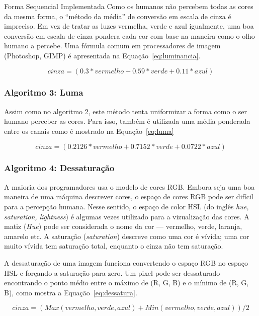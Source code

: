 \begin{subsection}{Forma Sequencial Implementada}
Como os humanos não percebem todas as cores da mesma forma, o ``método da média'' de
conversão em escala de cinza é impreciso. Em vez de tratar as luzes vermelha,
verde e azul igualmente, uma boa conversão em escala de cinza pondera cada cor
com base na maneira como o olho humano a percebe. Uma fórmula comum em
processadores de imagem (Photoshop, GIMP) é apresentada na
Equação~\ref{eq:luminancia}.


\begin{equation}
\label{eq:luminancia}
cinza = (0.3*vermelho + 0.59*verde + 0.11*azul)
\end{equation}

\subsubsection{Algoritmo 3: Luma}

Assim como no algoritmo 2, este método tenta uniformizar a forma como o ser
humano perceber as cores. Para isso, também é utilizada uma média ponderada
entre os canais como é mostrado na Equação~\ref{eq:luma}

\begin{equation}
\label{eq:luma}
cinza = (0.2126*vermelho + 0.7152*verde + 0.0722*azul)
\end{equation}


\subsubsection{Algoritmo 4: Dessaturação}

A maioria dos programadores usa o modelo de cores RGB. Embora seja uma boa
maneira de uma máquina descrever cores, o espaço de cores RGB pode ser difícil
para a percepção humana. Nesse sentido, o espaço de color HSL (do inglês
\textit{hue, saturation, lightness}) é algumas vezes utilizado para a
vizualização das cores. A matiz (\textit{Hue}) pode ser considerada o nome da
cor --- vermelho, verde, laranja, amarelo etc.  A saturação
(\textit{saturation}) descreve como uma cor é vívida; uma cor muito vívida tem
saturação total, enquanto o cinza não tem saturação. 

A dessaturação de uma imagem funciona convertendo o espaço RGB no espaço HSL e 
forçando a saturação para zero. Um pixel pode ser dessaturado encontrando o
ponto médio entre o máximo de (R, G, B) e o mínimo de (R, G, B), como mostra a
Equação~\ref{eq:dessatura}.

\begin{equation}
\label{eq:dessatura}
cinza = ( Max(vermelho, verde, azul) + Min(vermelho, verde, azul) ) / 2
\end{equation}




\end{subsection}
